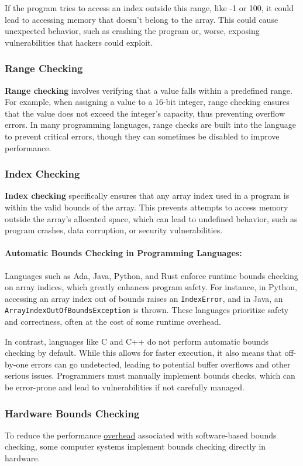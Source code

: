 \documentclass[12pt, oneside]{book}
\begin{document}
If the program tries to access an index outside this range, like -1 or 100, it could lead to accessing memory that doesn't belong to the array. This could cause unexpected behavior, such as crashing the program or, worse, exposing vulnerabilities that hackers could exploit.

\subsubsection{Range Checking}
\textbf{Range checking} involves verifying that a value falls within a predefined range. For example, when assigning a value to a 16-bit integer, range checking ensures that the value does not exceed the integer's capacity, thus preventing overflow errors. In many programming languages, range checks are built into the language to prevent critical errors, though they can sometimes be disabled to improve performance.

\subsubsection{Index Checking}
\textbf{Index checking} specifically ensures that any array index used in a program is within the valid bounds of the array. This prevents attempts to access memory outside the array’s allocated space, which can lead to undefined behavior, such as program crashes, data corruption, or security vulnerabilities.

\paragraph{Automatic Bounds Checking in Programming Languages:}
Languages such as Ada, Java, Python, and Rust enforce runtime bounds checking on array indices, which greatly enhances program safety. For instance, in Python, accessing an array index out of bounds raises an \texttt{IndexError}, and in Java, an \texttt{ArrayIndexOutOfBoundsException} is thrown. These languages prioritize safety and correctness, often at the cost of some runtime overhead.

In contrast, languages like C and C++ do not perform automatic bounds checking by default. While this allows for faster execution, it also means that off-by-one errors can go undetected, leading to potential buffer overflows and other serious issues. Programmers must manually implement bounds checks, which can be error-prone and lead to vulnerabilities if not carefully managed.

\subsubsection{Hardware Bounds Checking}
To reduce the performance \href{https://en.wikipedia.org/wiki/Overhead_(computing)}{overhead} associated with software-based bounds checking, some computer systems implement bounds checking directly in hardware. 
\end{document}
